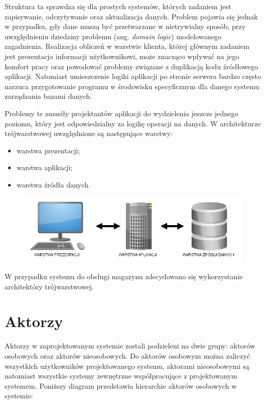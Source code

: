Struktura ta sprawdza się dla prostych systemów, których zadaniem jest
zapisywanie, odczytywanie oraz aktualizacja danych. Problem
pojawia się jednak w przypadku, gdy dane muszą być przetwarzane w
nietrywialny sposób, przy uwzględnieniu dziedziny problemu (ang. \emph{domain
logic}) modelowanego zagadnienia. Realizacja obliczeń w warstwie klienta,
której głównym zadaniem jest prezentacja informacji użytkownikowi, może
znacząco wpływać na jego komfort pracy oraz powodować problemy związane z
duplikacją kodu źródłowego aplikacji.
Natomiast umieszczenie logiki aplikacji po stronie serwera bardzo często narzuca
przygotowanie programu w środowisku specyficznym dla danego systemu zarządzania
bazami danych. 

Problemy te zmusiły projektantów aplikacji do wydzielenia jeszcze jednego
poziomu, który jest odpowiedzialny za logikę operacji na danych. W
architekturze trójwarstwowej uwzględnione są następujące warstwy:
\begin{itemize}
 \item warstwa prezentacji;
 \item warstwa aplikacji;
 \item warstwa źródła danych.
\end{itemize}

\begin{figure}[h]
    \begin{center}
    \includegraphics[scale=0.5]{../img/arch-3warstw.png}
    \end{center}
    \label{fig:arch3warstw}
\end{figure}
\FloatBarrier
W przypadku systemu do obsługi magazynu zdecydowano się wykorzystanie
architektóry trójwarstwowej.

\section{Aktorzy}

Aktorzy w zaprojektowanym systemie zostali podzieleni na dwie grupy: aktorów
osobowych oraz aktorów nieosobowych. Do aktorów osobowym można zaliczyć
wszystkich użytkowników projektowanego systemu, aktorami nieosobowymi są
natomiast wszystkie systemy zewnętrzne współpracujące z projektowanym systemem.
Poniższy diagram przedstawia hierarchie aktorów osobowych w systemie:

